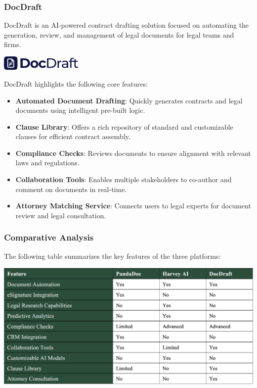 \subsubsection{DocDraft}
DocDraft is an AI-powered contract drafting solution focused on automating the generation, review, and management of legal documents for legal teams and firms.\mynewline

\begin{center}
    \centering
    \includegraphics[width=0.3\textwidth]{Images/docdraft_logo.png}
     \cite{docdraft_logo}
    \label{fig:docdraft_logo}
\end{center}

DocDraft highlights the following core features:
\begin{itemize}
    \item \textbf{Automated Document Drafting}: Quickly generates contracts and legal documents using intelligent pre-built logic.
    \item \textbf{Clause Library}: Offers a rich repository of standard and customizable clauses for efficient contract assembly.
    \item \textbf{Compliance Checks}: Reviews documents to ensure alignment with relevant laws and regulations.
    \item \textbf{Collaboration Tools}: Enables multiple stakeholders to co-author and comment on documents in real-time.
    \item \textbf{Attorney Matching Service}: Connects users to legal experts for document review and legal consultation.
\end{itemize}

\subsubsection{Comparative Analysis}
The following table summarizes the key features of the three platforms:\vspace{-0.3cm}

\begin{center}
    \centering
    \includegraphics[width=1\textwidth]{Images/Comparison of Contract Management and Legal AI Platforms.png}
    \label{tab:comparison_legal_platforms}
\end{center}

